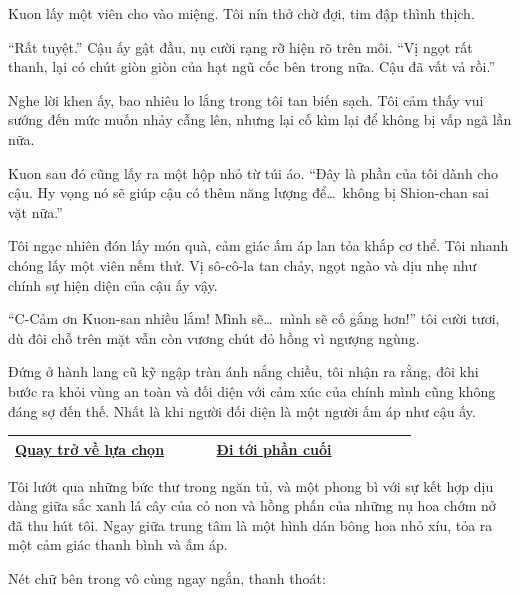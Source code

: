 \documentclass[../main.tex]{subfiles}
\begin{document}
Kuon lấy một viên cho vào miệng. Tôi nín thở chờ đợi, tim đập thình thịch.

``Rất tuyệt.'' Cậu ấy gật đầu, nụ cười rạng rỡ hiện rõ trên môi. ``Vị ngọt rất thanh, lại có chút giòn giòn của hạt ngũ cốc bên trong nữa. Cậu đã vất vả rồi.''

Nghe lời khen ấy, bao nhiêu lo lắng trong tôi tan biến sạch. Tôi cảm thấy vui sướng đến mức muốn nhảy cẫng lên, nhưng lại cố kìm lại để không bị vấp ngã lần nữa.

Kuon sau đó cũng lấy ra một hộp nhỏ từ túi áo. ``Đây là phần của tôi dành cho cậu. Hy vọng nó sẽ giúp cậu có thêm năng lượng để\dots\ không bị Shion-chan sai vặt nữa.''

Tôi ngạc nhiên đón lấy món quà, cảm giác ấm áp lan tỏa khắp cơ thể. Tôi nhanh chóng lấy một viên nếm thử. Vị sô-cô-la tan chảy, ngọt ngào và dịu nhẹ như chính sự hiện diện của cậu ấy vậy.

``C-Cảm ơn Kuon-san nhiều lắm! Mình sẽ\dots\ mình sẽ cố gắng hơn!'' tôi cười tươi, dù đôi chỗ trên mặt vẫn còn vương chút đỏ hồng vì ngượng ngùng.

Đứng ở hành lang cũ kỹ ngập tràn ánh nắng chiều, tôi nhận ra rằng, đôi khi bước ra khỏi vùng an toàn và đối diện với cảm xúc của chính mình cũng không đáng sợ đến thế. Nhất là khi người đối diện là một người ấm áp như cậu ấy.

\begin{table}[H]
  \centering
  \setlength{\arrayrulewidth}{1pt}
  \begin{tabular}{|>{\centering\arraybackslash}p{0.4\linewidth}|>{\centering\arraybackslash}p{0.4\linewidth}|}
    \hline
    \hyperref[choice]{Quay trở về lựa chọn} & \hyperref[ending]{Đi tới phần cuối} \\ \hline
  \end{tabular}
\end{table}

\newpage
\label{saki}

Tôi lướt qua những bức thư trong ngăn tủ, và một phong bì với sự kết hợp dịu dàng giữa sắc xanh lá cây của cỏ non và hồng phấn của những nụ hoa chớm nở đã thu hút tôi. Ngay giữa trung tâm là một hình dán bông hoa nhỏ xíu, tỏa ra một cảm giác thanh bình và ấm áp.

Nét chữ bên trong vô cùng ngay ngắn, thanh thoát:

\end{document}
